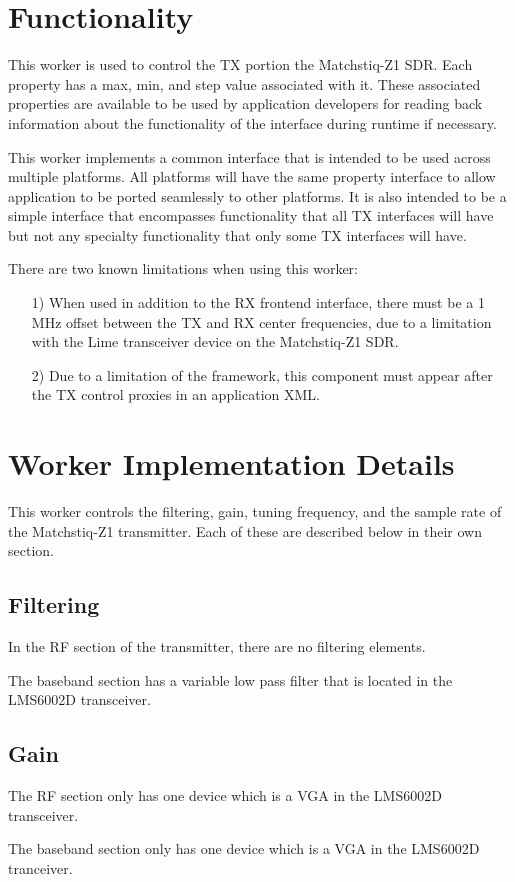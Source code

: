\documentclass{article}
\begin{document}
\section*{Functionality}
\begin{flushleft}
   This worker is used to control the TX portion the Matchstiq-Z1 SDR. Each property has a max, min, and step value associated with it. These associated properties are available to be used by application developers for reading back information about the functionality of the interface during runtime if necessary.\par\medskip
   This worker implements a common interface that is intended to be used across multiple platforms. All platforms will have the same property interface to allow application to be ported seamlessly to other platforms. It is also intended to be a simple interface that encompasses functionality that all TX interfaces will have but not any specialty functionality that only some TX interfaces will have.\par\medskip
	There are two known limitations when using this worker:
	\begin{itemize}
		\item[1)] When used in addition to the RX frontend interface, there must be a 1 MHz offset between the TX and RX center frequencies, due to a limitation with the Lime transceiver device on the Matchstiq-Z1 SDR.
		\item[2)] Due to a limitation of the framework, this component must appear after the TX control proxies in an application XML.
	\end{itemize}

\section*{Worker Implementation Details}
This worker  controls the filtering, gain, tuning frequency, and the sample rate of the Matchstiq-Z1 transmitter.  Each of these are described below in their own section.
\end{flushleft}
\subsection*{Filtering}
In the RF section of the transmitter, there are no filtering elements.\par\medskip
\noindent The baseband section has a variable low pass filter that is located in the LMS6002D transceiver.
\subsection*{Gain}
The RF section only has one device which is a VGA in the LMS6002D transceiver.\par\medskip
\noindent The baseband section only has one device which is a VGA in the LMS6002D tranceiver.
\end{document}
